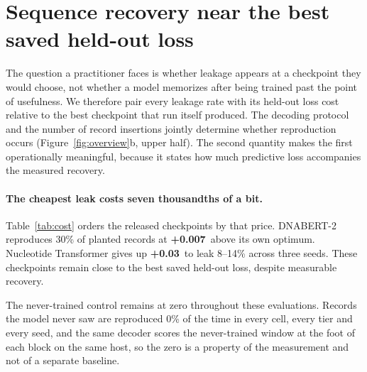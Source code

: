\section{Sequence recovery near the best saved held-out loss}
\label{sec:leak}

The question a practitioner faces is whether leakage appears at a checkpoint they would choose,
not whether a model memorizes after being trained past the point of usefulness. We
therefore pair every leakage rate with its held-out loss cost relative to the
best checkpoint that run itself produced. The decoding protocol and the number of record insertions jointly determine whether reproduction
occurs (Figure~\ref{fig:overview}b, upper half).
The second quantity makes the first operationally meaningful,
because it states how much predictive loss accompanies the measured recovery.

\paragraph{The cheapest leak costs seven thousandths of a bit.}
Table~\ref{tab:cost} orders the released checkpoints by that price. DNABERT-2 reproduces 30\% of
planted records at \textbf{+0.007\,\bits} above its own optimum. Nucleotide Transformer gives up
\textbf{+0.03\,\bits} to leak 8--14\% across three seeds. These checkpoints remain close to the best saved held-out loss, despite measurable recovery.

The never-trained control remains at zero throughout these evaluations. Records the model never saw are reproduced 0\% of the time in every
cell, every tier and every seed, and the same decoder scores the never-trained window at the foot of
each block on the same host, so the zero is a property of the measurement and not of a
separate baseline.

